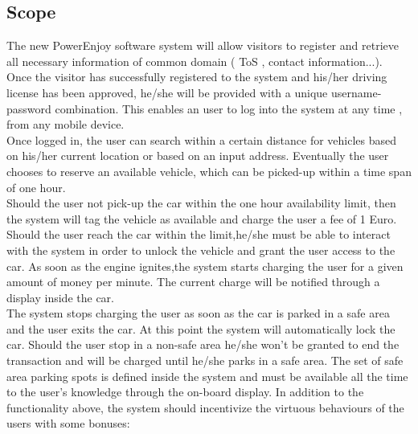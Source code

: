 \documentclass[12pt]{article}
\begin{document}
	 \subsection{\label{scope:1}Scope}
	The new PowerEnjoy software system will allow visitors to register and retrieve all necessary information of common domain ( ToS , contact information...). \\Once the visitor has successfully registered to the system and his/her driving license has been approved, he/she will be provided with a unique username-password combination. This enables an user to log into the system at any time , from any mobile device. \\Once logged in, the user can search within a certain distance for vehicles based on his/her current location or based on an input address. 
	Eventually the user chooses to reserve an available vehicle, which can be picked-up within a time span of one hour.\\ 
	Should the user not pick-up the car within the one hour availability limit, then the system will tag the vehicle as available and charge the user a fee of 1 Euro.\\
	Should the user reach the car within the limit,he/she must be able to  interact with the system in order to unlock the vehicle and grant the user access to the car.
	As soon as the engine ignites,the system starts charging the user for a given amount of money per minute. The current charge will be notified through a display inside the car.\\
	The system stops charging the user as soon as the car is parked in a safe area and the user exits the car. At this point the system will automatically lock the car.
	Should the user stop in a non-safe area he/she won't be granted to end the transaction and will be charged until  he/she parks in a safe area.
	The set of safe area parking spots is defined inside the system and must be available all the time to the user's knowledge through the on-board display.
	\newline
	In addition to the functionality above, the system should incentivize the virtuous behaviours of the users with some bonuses:
\end{document}
